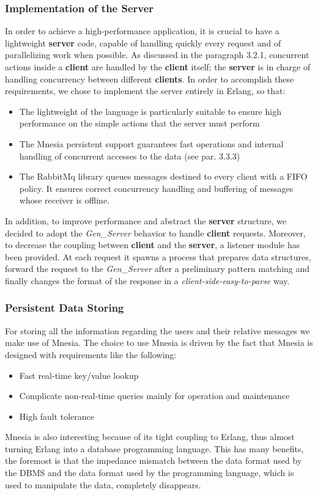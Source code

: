 \subsubsection{Implementation of the Server}
In order to achieve a high-performance application, it is crucial to have a lightweight \textbf{server} code, capable of handling quickly every request and of parallelizing work when possible. As discussed in the paragraph 3.2.1, concurrent actions inside a \textbf{client} are handled by the \textbf{client} itself; the \textbf{server}  is in charge of handling concurrency between different \textbf{clients}. In order to accomplish these requirements, we chose to implement the server entirely in Erlang, so that:
\begin{itemize}
	\item The lightweight of the language is particularly suitable to ensure high performance on the simple actions that the server must perform
	\item The Mnesia persistent support guarantees fast operations and internal handling of concurrent accesses to the data (see par. 3.3.3)
	\item The RabbitMq library queues messages destined to every client with a FIFO policy. It ensures correct concurrency handling and buffering of messages whose receiver is offline.
\end{itemize}
In addition, to improve performance and abstract the \textbf{server} structure, we decided to adopt the \textit{Gen\_Server} behavior to handle \textbf{client} requests.
Moreover, to decrease the coupling between \textbf{client} and the \textbf{server}, a listener module has been provided. At each request it spawns a process that prepares data structures, forward the request to the \textit{Gen\_Server}  after a preliminary pattern matching and finally changes the format of the response in a \textit{client-side-easy-to-parse} way. 


\subsubsection{Persistent Data Storing}
For storing all the information regarding the users and their relative messages we make use of Mnesia. The choice to use Mnesia is driven by the fact that Mnesia is designed with requirements like the following:
\begin{itemize}
	\item Fast real-time key/value lookup
	\item Complicate non-real-time queries mainly for operation and maintenance
	\item High fault tolerance
\end{itemize}
Mnesia is also interesting because of its tight coupling to Erlang, thus almost turning Erlang into a database programming language. This has many benefits, the foremost is that the impedance mismatch between the data format used by the DBMS and the data format used by the programming language, which is used to manipulate the data, completely disappears.

